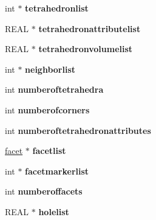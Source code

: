 \begin{DoxyCompactItemize}
\item 
\hypertarget{classtetgenio_ae53a07184487b2635d0f332ff818d938}{int $\ast$ {\bfseries tetrahedronlist}}\label{classtetgenio_ae53a07184487b2635d0f332ff818d938}

\item 
\hypertarget{classtetgenio_aeae735f4584f63311f1c9d46530eefe1}{R\-E\-A\-L $\ast$ {\bfseries tetrahedronattributelist}}\label{classtetgenio_aeae735f4584f63311f1c9d46530eefe1}

\item 
\hypertarget{classtetgenio_a1fe58bef7f029f7b84a8541851547382}{R\-E\-A\-L $\ast$ {\bfseries tetrahedronvolumelist}}\label{classtetgenio_a1fe58bef7f029f7b84a8541851547382}

\item 
\hypertarget{classtetgenio_ab79a85fdffb1ab3f93ff3645fb604d40}{int $\ast$ {\bfseries neighborlist}}\label{classtetgenio_ab79a85fdffb1ab3f93ff3645fb604d40}

\item 
\hypertarget{classtetgenio_ad9a3fc307214cd459ca367c55d4bc16d}{int {\bfseries numberoftetrahedra}}\label{classtetgenio_ad9a3fc307214cd459ca367c55d4bc16d}

\item 
\hypertarget{classtetgenio_a7d31410cbdcf2c1557ae7c1148c2eed7}{int {\bfseries numberofcorners}}\label{classtetgenio_a7d31410cbdcf2c1557ae7c1148c2eed7}

\item 
\hypertarget{classtetgenio_ac22e481bf9a3662b173599914a696f7a}{int {\bfseries numberoftetrahedronattributes}}\label{classtetgenio_ac22e481bf9a3662b173599914a696f7a}

\item 
\hypertarget{classtetgenio_ad65489b9aece6ba14ff8e3c89f533ced}{\hyperlink{structtetgenio_1_1facet}{facet} $\ast$ {\bfseries facetlist}}\label{classtetgenio_ad65489b9aece6ba14ff8e3c89f533ced}

\item 
\hypertarget{classtetgenio_a0d5d9d0718980f8e9d4ecc3e771abba0}{int $\ast$ {\bfseries facetmarkerlist}}\label{classtetgenio_a0d5d9d0718980f8e9d4ecc3e771abba0}

\item 
\hypertarget{classtetgenio_af1cb1515751c9cd0497abba62da8790d}{int {\bfseries numberoffacets}}\label{classtetgenio_af1cb1515751c9cd0497abba62da8790d}

\item 
\hypertarget{classtetgenio_a395bd7fc3f66dd013efd5176a0d54265}{R\-E\-A\-L $\ast$ {\bfseries holelist}}\label{classtetgenio_a395bd7fc3f66dd013efd5176a0d54265}


\end{DoxyCompactItemize}
